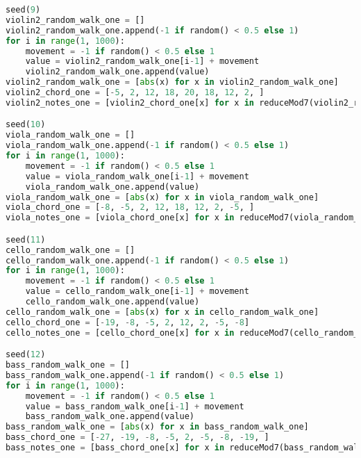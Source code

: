 \begin{lstlisting}[language=Python, caption=Tianshu Segment\_IV]
seed(9)
violin2_random_walk_one = []
violin2_random_walk_one.append(-1 if random() < 0.5 else 1)
for i in range(1, 1000):
    movement = -1 if random() < 0.5 else 1
    value = violin2_random_walk_one[i-1] + movement
    violin2_random_walk_one.append(value)
violin2_random_walk_one = [abs(x) for x in violin2_random_walk_one]
violin2_chord_one = [-5, 2, 12, 18, 20, 18, 12, 2, ]
violin2_notes_one = [violin2_chord_one[x] for x in reduceMod7(violin2_random_walk_one)]

seed(10)
viola_random_walk_one = []
viola_random_walk_one.append(-1 if random() < 0.5 else 1)
for i in range(1, 1000):
    movement = -1 if random() < 0.5 else 1
    value = viola_random_walk_one[i-1] + movement
    viola_random_walk_one.append(value)
viola_random_walk_one = [abs(x) for x in viola_random_walk_one]
viola_chord_one = [-8, -5, 2, 12, 18, 12, 2, -5, ]
viola_notes_one = [viola_chord_one[x] for x in reduceMod7(viola_random_walk_one)]

seed(11)
cello_random_walk_one = []
cello_random_walk_one.append(-1 if random() < 0.5 else 1)
for i in range(1, 1000):
    movement = -1 if random() < 0.5 else 1
    value = cello_random_walk_one[i-1] + movement
    cello_random_walk_one.append(value)
cello_random_walk_one = [abs(x) for x in cello_random_walk_one]
cello_chord_one = [-19, -8, -5, 2, 12, 2, -5, -8]
cello_notes_one = [cello_chord_one[x] for x in reduceMod7(cello_random_walk_one)]

seed(12)
bass_random_walk_one = []
bass_random_walk_one.append(-1 if random() < 0.5 else 1)
for i in range(1, 1000):
    movement = -1 if random() < 0.5 else 1
    value = bass_random_walk_one[i-1] + movement
    bass_random_walk_one.append(value)
bass_random_walk_one = [abs(x) for x in bass_random_walk_one]
bass_chord_one = [-27, -19, -8, -5, 2, -5, -8, -19, ]
bass_notes_one = [bass_chord_one[x] for x in reduceMod7(bass_random_walk_one)]


\end{lstlisting}
